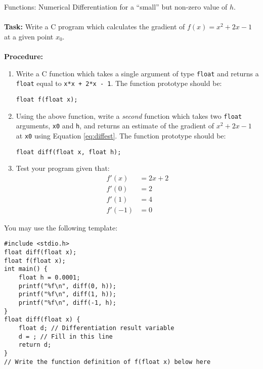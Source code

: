 \documentclass{lab}
\begin{document}
\begin{task}{Functions: Numerical Differentiation}{}
for a ``small'' but non-zero value of $h$.
\\~\\
\textbf{Task:} Write a C program which calculates the gradient of $f(x) = x^2 + 2x - 1$ at a given point $x_0$. 
\\~\\
\textbf{Procedure:}
\begin{enumerate}
\item Write a C function which takes a single argument of type \texttt{float} and returns a \texttt{float} equal to \texttt{x*x + 2*x - 1}. The function prototype should be:
\begin{lstlisting}[style=CStyle]
float f(float x);
\end{lstlisting}
\item Using the above function, write a \textit{second} function which takes two \texttt{float} arguments, \texttt{x0} and \texttt{h}, and returns an estimate of the gradient of $x^2 + 2x - 1$ at \texttt{x0} using Equation \eqref{eq:diffest}. The function prototype should be:
\begin{lstlisting}[style=CStyle]
float diff(float x, float h);
\end{lstlisting}
\item Test your program given that:
\begin{align*}
f\prime(x) &= 2x+2\\
f\prime(0) &= 2\\
f\prime(1) &= 4\\
f\prime(-1) &= 0
\end{align*}
\end{enumerate}
You may use the following template:
\begin{lstlisting}[style=Ctable]
#include <stdio.h>
float diff(float x);
float f(float x);
int main() {
	float h = 0.0001;
	printf("%f\n", diff(0, h));
	printf("%f\n", diff(1, h));
	printf("%f\n", diff(-1, h);
}
float diff(float x) {
	float d; // Differentiation result variable
	d = ; // Fill in this line
	return d;
}
// Write the function definition of f(float x) below here
\end{lstlisting}
\end{task}
\end{document}
